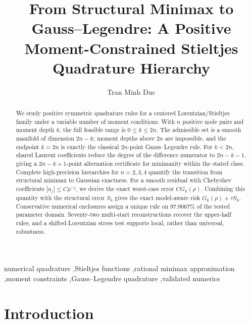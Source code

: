 \documentclass[preprint,12pt]{elsarticle}
\theoremstyle{remark}
\begin{document}
\begin{frontmatter}

\title{From Structural Minimax to Gauss--Legendre:
A Positive Moment-Constrained Stieltjes Quadrature Hierarchy}

\author[inst1]{Tran Minh Duc}


\begin{abstract}
We study positive symmetric quadrature rules for a
centered Lorentzian/Stieltjes family under a variable number of moment
conditions. With \(n\) positive node pairs and moment depth \(k\), the
full feasible range is \(0\leq k\leq 2n\). The admissible set is a smooth
manifold of dimension \(2n-k\); moment depths above \(2n\) are impossible,
and the endpoint \(k=2n\) is exactly the classical \(2n\)-point
Gauss--Legendre rule. For \(k<2n\), shared Laurent coefficients reduce
the degree of the difference numerator to \(2n-k-1\), giving a
\(2n-k+1\)-point alternation certificate for minimaxity within the
stated class. Complete high-precision hierarchies for \(n=2,3,4\)
quantify the transition from structural minimax to Gaussian exactness.
For a smooth residual with Chebyshev coefficients
\(|a_j|\leq C\rho^{-j}\), we derive the exact worst-case error
\(C G_k(\rho)\). Combining this quantity with the structural error
\(S_k\) gives the exact model-aware risk
\(G_k(\rho)+\tau S_k\). Conservative numerical enclosures assign a
unique rule on 97.9067\% of the tested parameter domain.
Seventy-two multi-start reconstructions recover the upper-half rules,
and a shifted-Lorentzian stress test supports local, rather than
universal, robustness.
\end{abstract}

\begin{keyword}
numerical quadrature \sep Stieltjes functions \sep rational minimax
approximation \sep moment constraints \sep Gauss--Legendre quadrature
\sep validated numerics
\end{keyword}

\end{frontmatter}

\section{Introduction}
\end{document}
